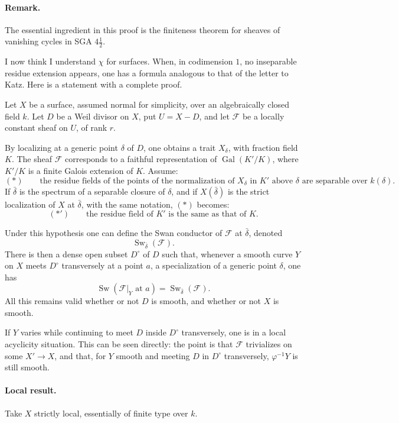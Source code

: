 \documentclass[11pt]{article}
\newcommand{\F}{\mathcal F}
\DeclareMathOperator{\Sw}{Sw}
\begin{document}
\paragraph{Remark.}
The essential ingredient in this proof is the finiteness theorem for sheaves of vanishing cycles in SGA \(4\frac12\).

I now think I understand \(\chi\) for surfaces. When, in codimension \(1\), no inseparable residue extension appears, one has a formula analogous to that of the letter to Katz. Here is a statement with a complete proof.

Let \(X\) be a surface, assumed normal for simplicity, over an algebraically closed field \(k\). Let \(D\) be a Weil divisor on \(X\), put \(U=X-D\), and let \(\F\) be a locally constant sheaf on \(U\), of rank \(r\).

By localizing at a generic point \(\delta\) of \(D\), one obtains a trait \(X_\delta\), with fraction field \(K\). The sheaf \(\F\) corresponds to a faithful representation of \(\operatorname{Gal}(K'/K)\), where \(K'/K\) is a finite Galois extension of \(K\). Assume:
\[
(*)\qquad
\text{the residue fields of the points of the normalization of }X_\delta
\text{ in }K'\text{ above }\delta\text{ are separable over }k(\delta).
\]
If \(\bar\delta\) is the spectrum of a separable closure of \(\delta\), and if \(X(\bar\delta)\) is the strict localization of \(X\) at \(\bar\delta\), with the same notation, \((*)\) becomes:
\[
(*')\qquad \text{the residue field of }K'\text{ is the same as that of }K.
\]

Under this hypothesis one can define the Swan conductor of \(\F\) at \(\bar\delta\), denoted
\[
  \Sw_{\bar\delta}(\F).
\]
There is then a dense open subset \(D^\circ\) of \(D\) such that, whenever a smooth curve \(Y\) on \(X\) meets \(D^\circ\) transversely at a point \(a\), a specialization of a generic point \(\delta\), one has
\[
  \Sw(\F|_Y\text{ at }a)=\Sw_{\bar\delta}(\F).
\]
All this remains valid whether or not \(D\) is smooth, and whether or not \(X\) is smooth.

If \(Y\) varies while continuing to meet \(D\) inside \(D^\circ\) transversely, one is in a local acyclicity situation. This can be seen directly: the point is that \(\F\) trivializes on some \(X'\to X\), and that, for \(Y\) smooth and meeting \(D\) in \(D^\circ\) transversely, \(\varphi^{-1}Y\) is still smooth.

\paragraph{Local result.}
Take \(X\) strictly local, essentially of finite type over \(k\).
\end{document}
